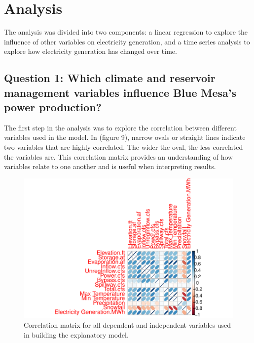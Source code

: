 \documentclass[
  12pt,
]{article}
\begin{document}
\newpage
\newpage

\hypertarget{analysis}{%
\section{Analysis}\label{analysis}}

The analysis was divided into two components: a linear regression to
explore the influence of other variables on electricity generation, and
a time series analysis to explore how electricity generation has changed
over time.

\hypertarget{question-1-which-climate-and-reservoir-management-variables-influence-blue-mesas-power-production}{%
\subsection{Question 1: Which climate and reservoir management variables
influence Blue Mesa's power
production?}\label{question-1-which-climate-and-reservoir-management-variables-influence-blue-mesas-power-production}}

The first step in the analysis was to explore the correlation between
different variables used in the model. In (figure 9), narrow ovals or
straight lines indicate two variables that are highly correlated. The
wider the oval, the less correlated the variables are. This correlation
matrix provides an understanding of how variables relate to one another
and is useful when interpreting results.

\begin{figure}

{\centering \includegraphics{Project_Report_files/figure-latex/correlation-1} 

}

\caption{Correlation matrix for all dependent and independent variables used in building the explanatory model.}\label{fig:correlation}
\end{figure}
\end{document}
